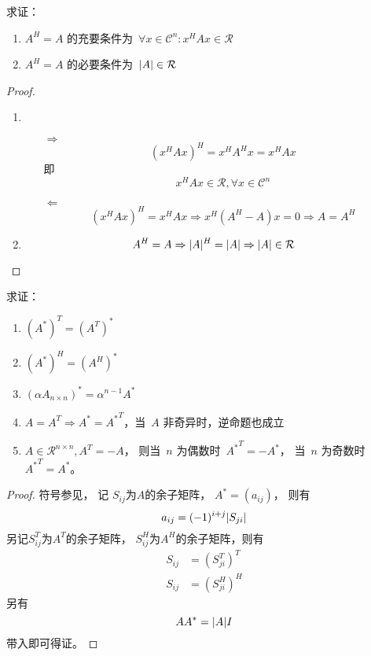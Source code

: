 \documentclass[twoside,openright]{book}
\begin{document}
\begin{CJK*}{UTF8}{}
\begin{quest}
\label{quest:18}
求证：
\begin{enumerate}
\item
$A^H=A$ 的充要条件为\ $\forall x\in\mathcal{C}^n: x^HAx\in\mathcal{R}$
\item
$A^H=A$ 的必要条件为\ $\lvert{A}\rvert\in\mathcal{R}$
\end{enumerate}
\end{quest}
\begin{proof}
$ $
\begin{enumerate}
\item
\begin{itemize}
\item[$\Rightarrow$]
\[
(x^H A x)^H = x^H A^H x = x^H A x
\]
即
\[
x^H A x \in \mathcal{R}, \forall x \in \mathcal{C}^n
\]
\item[$\Leftarrow$]
\[
(x^H A x)^H = x^H A x \Rightarrow x^H (A^H - A) x = 0 \Rightarrow A = A^H
\]
\end{itemize}
\item
\[
A^H = A \Rightarrow \lvert{A}\rvert^H = \lvert{A}\rvert \Rightarrow \lvert{A}\rvert \in \mathcal{R}
\]
\end{enumerate}
\end{proof}

\begin{quest}
\label{quest:19}
求证：
\begin{enumerate}
\item
$(A^*)^T=(A^T)^*$
\item
$(A^*)^H=(A^H)^*$
\item
$(\alpha A_{n\times n})^*=\alpha^{n-1}A^*$
\item
$A=A^T\Longrightarrow A^*={A^*}^T$，当\ $A$ 非奇异时，逆命题也成立
\item
$A\in\mathcal{R}^{n\times n},A^T=-A$，
则当\ $n$ 为偶数时\ ${A^*}^T=-A^*$，
当\ $n$ 为奇数时\ ${A^*}^T=A^*$。
\end{enumerate}
\end{quest}
\begin{proof}
符号参见{\cite{Xie99}}，
记
$S_{ij}$为$A$的余子矩阵，
$A^*=(a_{ij})$，
则有
\[
a_{ij} = (-1)^{i+j} \lvert{S_{ji}}\rvert
\]
另记$S^T_{ij}$为$A^T$的余子矩阵，
$S^H_{ij}$为$A^H$的余子矩阵，则有
\[
\begin{split}
S_{ij} &= \left( S^T_{ji} \right)^T \\
S_{ij} &= \left( S^H_{ji} \right)^H
\end{split}
\]
另有
\[
A A^* = \lvert{A}\rvert I
\]
带入即可得证。
\end{proof}


\end{CJK*}
\end{document}
